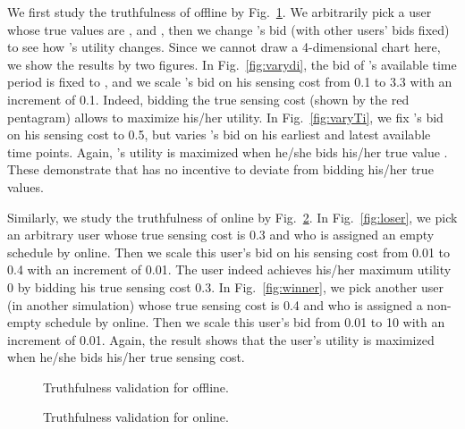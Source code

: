 \documentclass[10pt,journal,compsoc]{IEEEtran}
\begin{document}
    We first study the truthfulness of \textsf{offline} by Fig.~\ref{fig:offlinetuthfulness}. We arbitrarily pick a user  whose true values are ,  and , then we change 's bid (with other users' bids fixed) to see how 's utility changes. Since we cannot draw a 4-dimensional chart here, we show the results by two figures. In Fig.~\ref{fig:varydi}, the bid of 's available time period is fixed to , and we scale 's bid on his sensing cost from 0.1 to 3.3 with an increment of 0.1. Indeed, bidding the true sensing cost (shown by the red pentagram) allows  to maximize his/her utility. In Fig.~\ref{fig:varyTi}, we fix 's bid on his sensing cost to 0.5, but varies 's bid on his earliest and latest available time points. Again, 's utility is maximized when he/she bids his/her true value . These demonstrate that  has no incentive to deviate from bidding his/her true values.

    Similarly, we study the truthfulness of \textsf{online} by Fig.~\ref{fig:onlinetruthfulness}. In Fig.~\ref{fig:loser}, we pick an arbitrary user whose true sensing cost is 0.3 and who is assigned an empty schedule by \textsf{online}. Then we scale this user's bid on his sensing cost from 0.01 to 0.4 with an increment of 0.01. The user indeed achieves his/her maximum utility 0 by bidding his true sensing cost 0.3. In Fig.~\ref{fig:winner}, we pick another user (in another simulation) whose true sensing cost is 0.4 and who is assigned a non-empty schedule by \textsf{online}. Then we scale this user's bid from 0.01 to 10 with an increment of 0.01. Again, the result shows that the user's utility is maximized when he/she bids his/her true sensing cost.
\begin{figure}[htb]
\begin{center}
        \end{center} \vspace{-1ex}
        \caption{Truthfulness validation for \textsf{offline}.}
      \label{fig:offlinetuthfulness} \vspace{-2ex}
      \end{figure}
\begin{figure}[htb]
\begin{center}
        \end{center} \vspace{-1ex}
        \caption{Truthfulness validation for \textsf{online}.}
      \label{fig:onlinetruthfulness} \vspace{-2ex}
      \end{figure}
\end{document}
